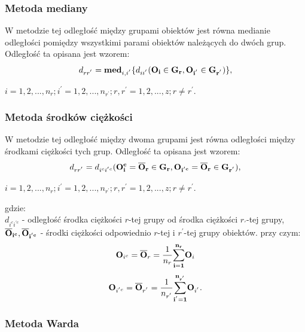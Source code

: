 \documentclass[12pt,a4paper]{report}
\begin{document}
\subsubsection{Metoda mediany}
\noindent

W metodzie tej odległość między grupami obiektów jest równa medianie odległości pomiędzy wszystkimi parami obiektów należących do dwóch grup. Odległość ta opisana jest wzorem: 
\begin{equation}
d_{rr^{'}}= \bold{med}_{i,i^{'}} \{d_{ii^{'}}(\bf{O_i} \in G_{r}, O_{i^{'}} \in G_{r^{'}})\},
\end{equation}
\begin{center}
$i=1,2,...,n_{r}; i^{'}=1,2,...,n_{r^{'}}; r,r^{'}=1,2,...,z; r \neq r^{'}. $
\end{center}

\subsubsection{Metoda środków ciężkości}
\noindent

W metodzie tej odległość między dwoma grupami jest równa odległości między środkami ciężkości tych grup. Odległość ta opisana jest wzorem: 
\begin{equation}
d_{rr^{'}}=d_{i^{c}i^{'c}}(\bf{O_i^{c}}=\overline{O}_{r}\in G_{r}, O_{i^{'c}}=\overline{O}_{r} \in G_{r^{'}}),
\end{equation}
\begin{center}
$i=1,2,...,n_{r}; i^{'}=1,2,...,n_{r^{'}}; r,r^{'}=1,2,...,z; r \neq r^{'}. $
\end{center}
gdzie:\\
$d_{i^{c}i^{'c}}$ - odległość środka ciężkości $r$-tej grupy od środka ciężkości $r_{'}$-tej grupy,\\
$\bf{\overline{O}_{i^{c}},\overline{O}_{i^{'c}}}$ - środki ciężkości odpowiednio $r$-tej i $r^{'}$-tej grupy obiektów. przy czym:
\begin{equation}
\bold{O}_{i^{c}}=\bold{\overline{O}}_{r}=\frac{1}{n_{r}}\bold{\sum_{i=1}^{n_{r}}} \bold{O}_{i}
\end{equation}
\begin{equation}
\bold{O}_{i^{'c}}=\bold{\overline{O}}_{r^{'}}=\frac{1}{n_{r^{'}}}\bold{\sum_{i^{'}=1}^{n_{r^{'}}}} \bold{O}_{i^{'}}.
\end{equation}

\subsubsection{Metoda Warda}
\noindent
\end{document}
